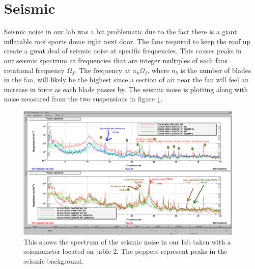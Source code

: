 \acresetall
\section{Seismic}
\label{sec:seismic}

Seismic noise in our lab was a bit problematic due to the fact there is a giant
inflatable roof sports dome right next door. The fans required to keep the roof
up create a great deal of seismic noise at specific frequencies.
This causes peaks in our seismic spectrum at frequencies that are integer
multiples of each fans rotational frequency $\Omega_f$.
The frequency at $n_b\Omega_f$, where $n_b$ is the number of blades in the fan,
will likely be the highest since a section of air near the fan will feel an
increase in force as each blade passes by. The seismic noise is plotting along
with noise measured from the two suspensions in figure \ref{fig:seismic}.


\begin{figure}
  \centering
  \includegraphics[width=15cm]{./figures/modehunting.png}
  \caption[Seismic Noise Spectrum]{
    This shows the spectrum of the seismic noise in our lab taken with a
    seismometer located on table 2.
    The peppers represent peaks in the seismic background.
    }
  \label{fig:seismic}
\end{figure}



